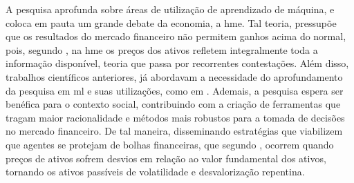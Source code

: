 A pesquisa aprofunda sobre áreas de utilização de aprendizado de máquina, e coloca em pauta um grande debate da economia, a \ac{hme}. Tal teoria, pressupõe que os resultados do mercado financeiro não permitem ganhos acima do normal, pois, segundo , na \acs{hme} os preços dos ativos refletem integralmente toda a informação disponível, teoria que passa por recorrentes contestações. Além disso, trabalhos científicos anteriores, já abordavam a necessidade do aprofundamento da pesquisa em \acl{ml} e suas utilizações, como em . Ademais, a pesquisa espera ser benéfica para o contexto social, contribuindo com a criação de ferramentas que tragam maior racionalidade e métodos mais robustos para a tomada de decisões no mercado financeiro. De tal maneira, disseminando estratégias que viabilizem que agentes se protejam de bolhas financeiras, que segundo , ocorrem quando preços de ativos sofrem desvios em relação ao valor fundamental dos ativos, tornando os ativos passíveis de volatilidade e desvalorização repentina.
